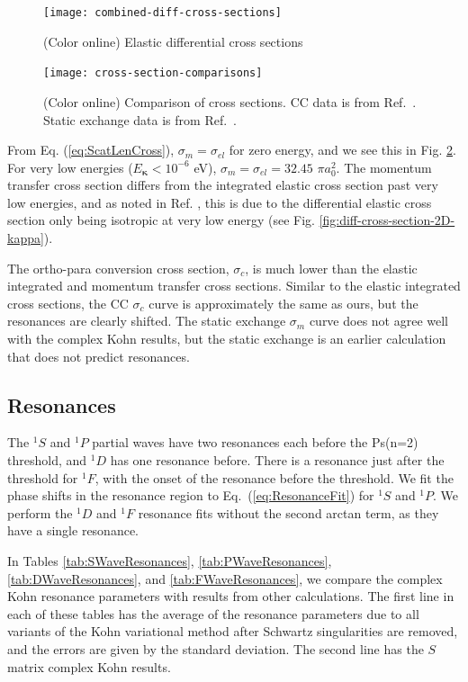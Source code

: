 \documentclass[preprint,showpacs,showkeys,preprintnumbers,amsmath,amssymb,longbibliography,pra,aps]{revtex4-1}
\begin{document}
\begin{figure}[H]
	\centering
	\texttt{[image: combined-diff-cross-sections]}
	\caption{(Color online) Elastic differential cross sections}
	\label{fig:combined-diff-cross-sections}
\end{figure}

\begin{figure}[H]
	\centering
	\texttt{[image: cross-section-comparisons]}
	\caption{(Color online) Comparison of cross sections. CC data is from
Ref.~\cite{Blackwood2002}. Static exchange data is from Ref.~\cite{Hara1975}.}
	\label{fig:cross-section-comparisons}
\end{figure}

From Eq. (\ref{eq:ScatLenCross}), $\sigma_m = \sigma_{el}$ for zero energy, 
and we see this in Fig. \ref{fig:cross-section-comparisons}. For very low 
energies ($E_{\bm \kappa} < 10^{-6}$ eV),
$\sigma_m = \sigma_{el} = 32.45$ $\pi a_0^2$.
The momentum transfer cross section differs from the integrated elastic cross
section past very low energies, and as 
noted in Ref. \cite{Blackwood2002c}, this is due to the differential elastic 
cross section only being isotropic at very low energy
(see Fig. \ref{fig:diff-cross-section-2D-kappa}).

The ortho-para conversion cross section, $\sigma_c$, is much lower than the 
elastic integrated and momentum transfer cross sections. Similar to the 
elastic integrated cross sections, the CC $\sigma_c$ curve \cite{Blackwood2002}
is approximately the same as ours, but the resonances are clearly shifted. 
The static exchange $\sigma_m$ curve \cite{Hara1975} does not agree well with 
the complex Kohn results, but the static exchange is an earlier calculation 
that does not predict resonances.

\subsection{Resonances}
\label{sec:Resonances}
The $^1S$ and $^1P$ partial waves have two resonances each before the Ps(n=2) 
threshold, and $^1D$ has one resonance before. There is a resonance just 
after the threshold for $^1F$, with the onset of the resonance before the 
threshold. We fit the phase shifts in the resonance region to
Eq.~(\ref{eq:ResonanceFit}) for $^1S$ and $^1P$. We perform the $^1D$ and $^1F$
resonance fits without the second arctan term, as they have a single resonance.

In Tables \ref{tab:SWaveResonances}, \ref{tab:PWaveResonances},
\ref{tab:DWaveResonances}, and \ref{tab:FWaveResonances},
we compare the complex Kohn resonance parameters with results from other
calculations. The first line in each of these tables has the average of the
resonance parameters due to all variants of the Kohn variational method after
Schwartz singularities are removed, and the errors are given by the standard 
deviation. The second line has the $S$ matrix complex Kohn results.
\end{document}
